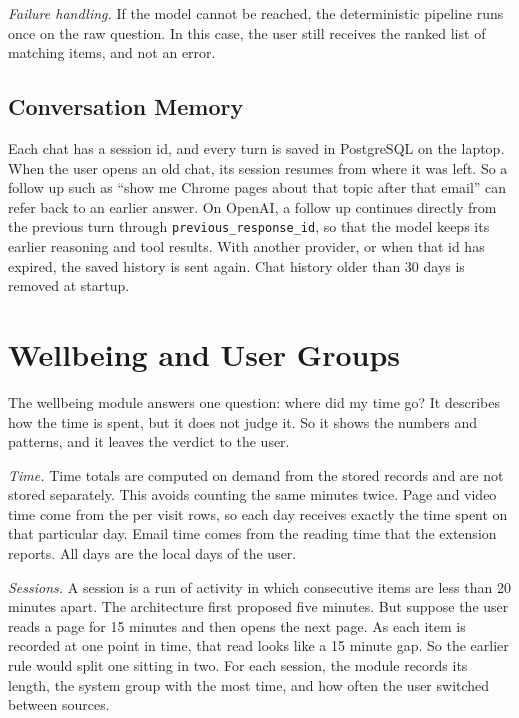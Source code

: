 \documentclass[conference]{IEEEtran}
\begin{document}
\textit{Failure handling.} If the model cannot be reached, the deterministic pipeline runs once on the raw question. In this case, the user still receives the ranked list of matching items, and not an error.

\subsection{Conversation Memory}
Each chat has a session id, and every turn is saved in PostgreSQL on the laptop. When the user opens an old chat, its session resumes from where it was left. So a follow up such as ``show me Chrome pages about that topic after that email'' can refer back to an earlier answer. On OpenAI, a follow up continues directly from the previous turn through \texttt{previous\_response\_id}, so that the model keeps its earlier reasoning and tool results. With another provider, or when that id has expired, the saved history is sent again. Chat history older than 30 days is removed at startup.

\section{Wellbeing and User Groups}\label{sec:wba}
The wellbeing module answers one question: where did my time go? It describes how the time is spent, but it does not judge it. So it shows the numbers and patterns, and it leaves the verdict to the user.

\textit{Time.} Time totals are computed on demand from the stored records and are not stored separately. This avoids counting the same minutes twice. Page and video time come from the per visit rows, so each day receives exactly the time spent on that particular day. Email time comes from the reading time that the extension reports. All days are the local days of the user.

\textit{Sessions.} A session is a run of activity in which consecutive items are less than 20 minutes apart. The architecture first proposed five minutes. But suppose the user reads a page for 15 minutes and then opens the next page. As each item is recorded at one point in time, that read looks like a 15 minute gap. So the earlier rule would split one sitting in two. For each session, the module records its length, the system group with the most time, and how often the user switched between sources.
\end{document}
